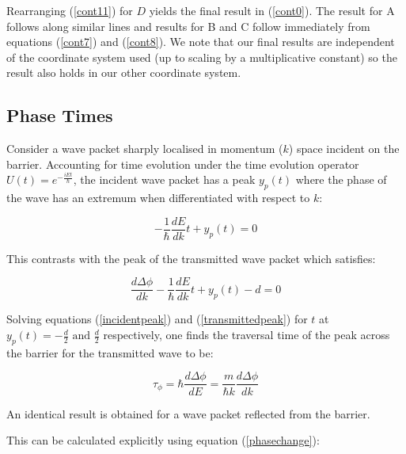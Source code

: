 \documentclass{article}
\begin{document}
\noindent Rearranging (\ref{cont11}) for $D$ yields the final result in (\ref{cont0}). The result for A follows along similar lines and results for B and C follow immediately from equations (\ref{cont7}) and (\ref{cont8}). We note that our final results are independent of the coordinate system used (up to scaling by a multiplicative constant) so the result also holds in our other coordinate system.

\subsection{Phase Times}

\noindent Consider a wave packet sharply localised in momentum ($k$) space incident on the barrier. Accounting for time evolution under the time evolution operator $U(t)=e^{-\frac{iEt}{\hbar}}$, the incident wave packet has a peak $y_p(t)$ where the phase of the wave has an extremum when differentiated with respect to $k$:

\begin{equation}
	-\frac{1}{\hbar}\frac{dE}{dk}t+y_p(t)=0
	\label{incidentpeak}
\end{equation}

\noindent This contrasts with the peak of the transmitted wave packet which satisfies:

\begin{equation}
	\frac{d\Delta\phi}{dk}-\frac{1}{\hbar}\frac{dE}{dk}t+y_p(t)-d=0
	\label{transmittedpeak}
\end{equation}

\noindent Solving equations (\ref{incidentpeak}) and (\ref{transmittedpeak}) for $t$ at $y_p(t) = -\frac{d}{2} \text{ and } \frac{d}{2}$ respectively, one finds the traversal time of the peak across the barrier for the transmitted wave to be:

\begin{equation}
	\tau_\phi = \hbar \frac{d\Delta\phi}{dE} = \frac{m}{\hbar k}\frac{d\Delta\phi}{dk}
	\label{buttikerphasetime}
\end{equation}

\noindent An identical result is obtained for a wave packet reflected from the barrier.

\noindent This can be calculated explicitly using equation (\ref{phasechange}):
\end{document}
